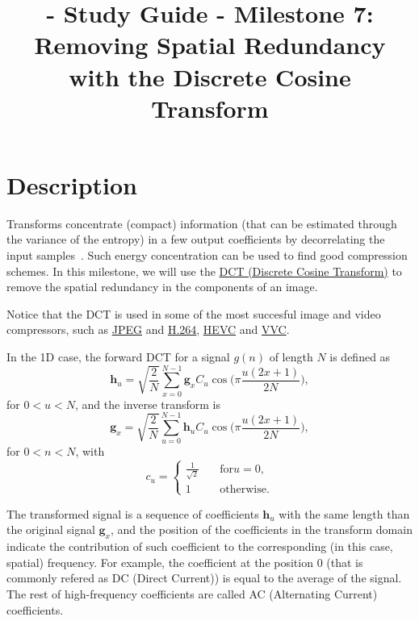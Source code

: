 
\title{\SM{} - Study Guide - Milestone 7: Removing Spatial Redundancy with the Discrete Cosine Transform}

\maketitle

\tableofcontents

\section{Description}

Transforms concentrate (compact) information (that can be estimated
through the variance of the entropy) in a few output coefficients by
decorrelating the input samples~\cite{sayood2017introduction}. Such
energy concentration can be used to find good compression schemes. In
this milestone, we will use
the \href{https://en.wikipedia.org/wiki/Discrete_cosine_transform}{DCT
(Discrete Cosine Transform)} to remove the spatial redundancy in the
components of an image.

Notice that the DCT is used in some of the most succesful image and
video compressors, such as
\href{https://en.wikipedia.org/wiki/JPEG}{JPEG} and
\href{https://en.wikipedia.org/wiki/Advanced_Video_Coding}{H.264},
\href{https://en.wikipedia.org/wiki/Advanced_Video_Coding}{HEVC} and
\href{https://en.wikipedia.org/wiki/Versatile_Video_Coding}{VVC}.

In the 1D case, the forward DCT for a signal $g(n)$ of
length $N$ is defined as~\cite{burger2016digital}
\begin{equation}
  {\mathbf h}_u = \sqrt{\frac{2}{N}}\sum_{x=0}^{N-1}{\mathbf
    g}_xC_u\cos\Big(\pi\frac{u(2x+1)}{2N}\Big),
\end{equation}
for $0<u<N$, and the inverse transform is
\begin{equation}
  {\mathbf g}_x = \sqrt{\frac{2}{N}}\sum_{u=0}^{N-1}{\mathbf
    h}_uC_u\cos\Big(\pi\frac{u(2x+1)}{2N}\Big),
\end{equation}
for $0<n<N$, with
\begin{equation}
  c_u = \left\{
  \begin{array}{ll}
    \frac{1}{\sqrt{2}} & \quad \text{for} u=0, \\
    1 & \quad \text{otherwise}.
  \end{array}
  \right.
\end{equation}

The transformed signal is a sequence of coefficients ${\mathbf h}_u$
with the same length than the original signal ${\mathbf g}_x$, and the
position of the coefficients in the transform domain indicate the
contribution of such coefficient to the corresponding (in this case,
spatial) frequency. For example, the coefficient at the position 0
(that is commonly refered as DC (Direct Current)) is equal to the
average of the signal. The rest of high-frequency coefficients are
called AC (Alternating Current) coefficients.

